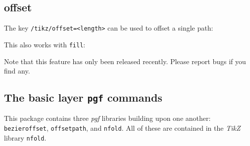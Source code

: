 \documentclass[12pt,a4paper]{article}
\theoremstyle{definition}
\newcommand{\nfold}{\texttt{nfold}}
\begin{document}
\subsection{offset}
The key \texttt{/tikz/offset=<length>} can be used to offset a single path:
\begin{tkzexample}[latex=2.5cm]
\end{tkzexample}
This also works with \texttt{fill}:
\begin{tkzexample}[latex=2.5cm]
\end{tkzexample}
Note that this feature has only been released recently. Please report bugs if you find any.

\subsection{The basic layer \texttt{pgf} commands}

This package contains three \emph{pgf} libraries building upon one another: \texttt{bezieroffset}, \texttt{offsetpath}, and \nfold. All of these are contained in the \emph{TikZ} library \nfold. 
\end{document}
